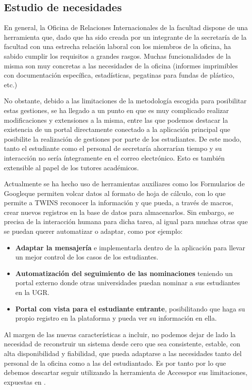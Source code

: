 \subsection{Estudio de necesidades}

En general, la Oficina de Relaciones Internacionales de la facultad dispone de una herramienta que, dado que ha sido creada por un integrante de la secretaría de la facultad con una estrecha relación laboral con los miembros de la oficina, ha sabido cumplir los requisitos a grandes rasgos. Muchas funcionalidades de la misma son muy concretas a las necesidades de la oficina (informes imprimibles con documentación específica, estadísticas, pegatinas para fundas de plástico, etc.)

No obstante, debido a las limitaciones de la metodología escogida para posibilitar estas gestiones, se ha llegado a un punto en que es muy complicado realizar modificaciones y extensiones a la misma, entre las que podemos destacar la existencia de un portal directamente conectado a la aplicación principal que posibilite la realización de gestiones por parte de los estudiantes. De este modo, tanto el estudiante como el personal de secretaría ahorrarían tiempo y su interacción no sería íntegramente en el correo electrónico. Esto es también extensible al papel de los tutores académicos.

Actualmente se ha hecho uso de herramientas auxiliares como los Formularios de Google\textregistered que permiten volcar datos al formato de hoja de cálculo, con lo que permite a TWINS reconocer la información y que pueda, a través de macros, crear nuevos registros en la base de datos para almacenarlos. Sin embargo, se precisa de la interacción humana para dicha tarea, al igual para muchas otras que se puedan querer automatizar o adaptar, como por ejemplo:

\begin{itemize}
	\item \textbf{Adaptar la mensajería} e implementarla dentro de la aplicación para llevar un mejor control de los casos de los estudiantes.
	\item \textbf{Automatización del seguimiento de las nominaciones} teniendo un portal externo donde otras universidades puedan nominar a sus estudiantes en la UGR.
	\item \textbf{Portal con vista para el estudiante entrante}, posibilitando que haga su propio registro en la plataforma y pueda ver su información en ella.
\end{itemize}

Al margen de las nuevas características a incluir, no podemos dejar de lado la necesidad de reconstruir un sistema desde cero que sea consistente, estable, con alta disponibilidad y fiabilidad, que pueda adaptarse a las necesidades tanto del personal de la oficina como a las del estudiantado. Es por tanto por lo que debemos descartar seguir utilizando la herramienta de Access\textregistered por sus limitaciones, expuestas en .